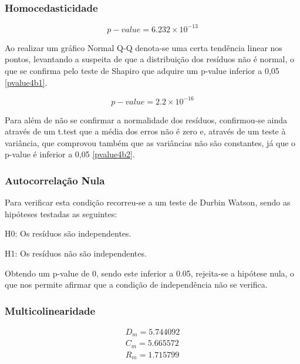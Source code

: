 \documentclass[conference]{IEEEtran}
\begin{document}
\subsubsection{Homocedasticidade} 

\begin{equation}
p-value = 6.232\times 10^{-13}\label{pvalue4b1}
\end{equation}

Ao realizar um gráfico Normal Q-Q denota-se uma certa tendência linear nos pontos, levantando a suspeita de que a distribuição dos resíduos não é normal, o que se confirma pelo teste de Shapiro que adquire um p-value inferior a 0,05 \eqref{pvalue4b1}.

\begin{equation}
p-value = 2.2\times 10^{-16}\label{pvalue4b2}
\end{equation}

Para além de não se confirmar a normalidade dos resíduos, confirmou-se ainda através de um t.test que a média dos erros não é zero e, através de um teste à variância, que comprovou também que as variâncias não são constantes, já que o p-value é inferior a 0,05 \eqref{pvalue4b2}.

\subsubsection{Autocorrelação Nula} 
Para verificar esta condição recorreu-se a um teste de Durbin Watson, sendo as hipóteses testadas as seguintes:

H0: Os resíduos são independentes.

H1: Os resíduos não são independentes.

Obtendo um p-value de 0, sendo este inferior a 0.05, rejeita-se a hipótese nula, o que nos permite afirmar que a condição de independência não se verifica.

\subsubsection{Multicolinearidade} 

\begin{equation}
\begin{array}{l}
	D_{m}=5.744092 \\
	C_{m}=5.665572 \\
	R_{m}=1.715799
\end{array} \label{DmCmRm}
\end{equation}
\end{document}
